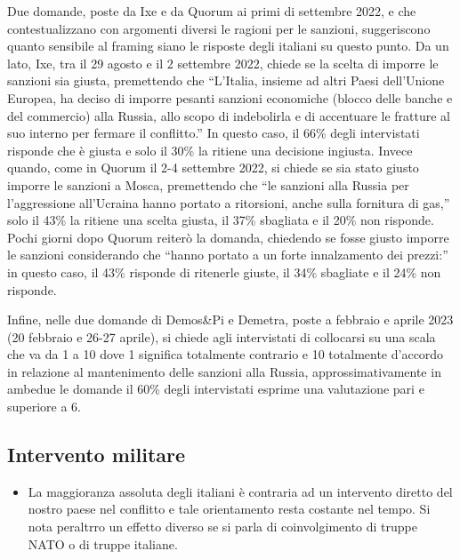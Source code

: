 \documentclass[
]{book}
\providecommand{\tightlist}{%
  \setlength{\itemsep}{0pt}\setlength{\parskip}{0pt}}
\begin{document}
Due domande, poste da Ixe e da Quorum ai primi di settembre 2022, e che contestualizzano con argomenti diversi le ragioni per le sanzioni, suggeriscono quanto sensibile al framing siano le risposte degli italiani su questo punto. Da un lato, Ixe, tra il 29 agosto e il 2 settembre 2022, chiede se la scelta di imporre le sanzioni sia giusta, premettendo che ``L'Italia, insieme ad altri Paesi dell'Unione Europea, ha deciso di imporre pesanti sanzioni economiche (blocco delle banche e del commercio) alla Russia, allo scopo di indebolirla e di accentuare le fratture al suo interno per fermare il conflitto.'' In questo caso, il 66\% degli intervistati risponde che è giusta e solo il 30\% la ritiene una decisione ingiusta. Invece quando, come in Quorum il 2-4 settembre 2022, si chiede se sia stato giusto imporre le sanzioni a Mosca, premettendo che ``le sanzioni alla Russia per l'aggressione all'Ucraina hanno portato a ritorsioni, anche sulla fornitura di gas,'' solo il 43\% la ritiene una scelta giusta, il 37\% sbagliata e il 20\% non risponde. Pochi giorni dopo Quorum reiterò la domanda, chiedendo se fosse giusto imporre le sanzioni considerando che ``hanno portato a un forte innalzamento dei prezzi:'' in questo caso, il 43\% risponde di ritenerle giuste, il 34\% sbagliate e il 24\% non risponde.

Infine, nelle due domande di Demos\&Pi e Demetra, poste a febbraio e aprile 2023 (20 febbraio e 26-27 aprile), si chiede agli intervistati di collocarsi su una scala che va da 1 a 10 dove 1 significa totalmente contrario e 10 totalmente d'accordo in relazione al mantenimento delle sanzioni alla Russia, approssimativamente in ambedue le domande il 60\% degli intervistati esprime una valutazione pari e superiore a 6.

\hypertarget{intervento-militare}{%
\subsection{Intervento militare}\label{intervento-militare}}

\begin{itemize}
\tightlist
\item
  La maggioranza assoluta degli italiani è contraria ad un intervento diretto del nostro paese nel conflitto e tale orientamento resta costante nel tempo. Si nota peraltrro un effetto diverso se si parla di coinvolgimento di truppe NATO o di truppe italiane.
\end{itemize}
\end{document}
